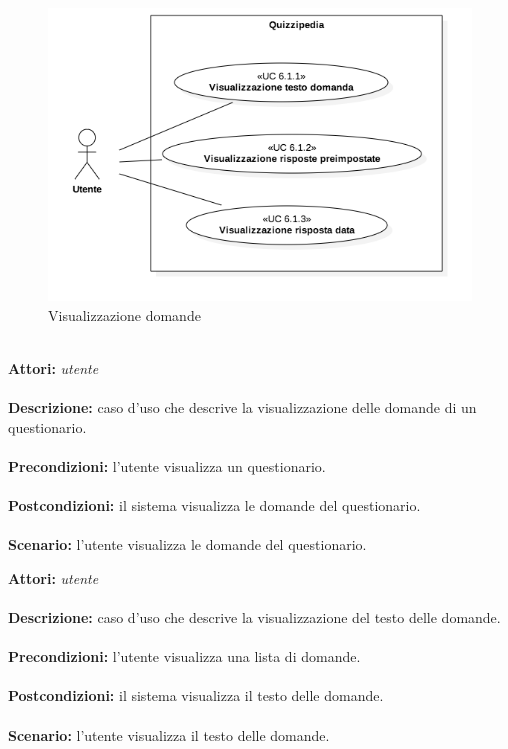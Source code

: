 \documentclass[a4paper,11pt]{article}
\begin{document}
\begin{figure}[h!]
\centering
\includegraphics[scale=0.6]{../immagini/UC6_1.png}
\caption{Visualizzazione domande}
\end{figure}
\ \\
\textbf{Attori:} \textit{utente}
\\ \\
\textbf{Descrizione:} caso d'uso che descrive la visualizzazione delle domande di un questionario.\\
\\
\textbf{Precondizioni:} l'utente visualizza un questionario.\\
\\
\textbf{Postcondizioni:} il sistema visualizza le domande del questionario.\\
\\
\textbf{Scenario:} l’utente visualizza le domande del questionario.\\



\textbf{Attori:} \textit{utente}
\\ \\
\textbf{Descrizione:} caso d'uso che descrive la visualizzazione del testo delle domande.\\
\\
\textbf{Precondizioni:} l'utente visualizza una lista di domande.\\
\\
\textbf{Postcondizioni:} il sistema visualizza il testo delle domande.\\
\\
\textbf{Scenario:} l’utente visualizza il testo delle domande.\\
\end{document}
